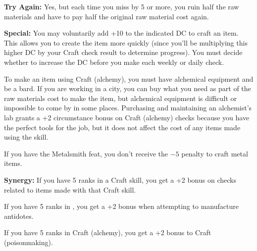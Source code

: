 \textbf{Try Again:} Yes, but each time you miss by 5 or more, you ruin half the raw materials and have to pay half the original raw material cost again.

\textbf{Special:} You may voluntarily add +10 to the indicated DC to craft an item. This allows you to create the item more quickly (since you'll be multiplying this higher DC by your Craft check result to determine progress). You must decide whether to increase the DC before you make each weekly or daily check.

To make an item using Craft (alchemy), you must have alchemical equipment and be a bard. If you are working in a city, you can buy what you need as part of the raw materials cost to make the item, but alchemical equipment is difficult or impossible to come by in some places. Purchasing and maintaining an alchemist's lab grants a +2 circumstance bonus on Craft (alchemy) checks because you have the perfect tools for the job, but it does not affect the cost of any items made using the skill.

If you have the Metalsmith feat, you don't receive the $-5$ penalty to craft metal items.

\textbf{Synergy:} If you have 5 ranks in a Craft skill, you get a +2 bonus on  checks related to items made with that Craft skill.

If you have 5 ranks in , you get a +2 bonus when attempting to manufacture antidotes.

If you have 5 ranks in Craft (alchemy), you get a +2 bonus to Craft (poisonmaking).